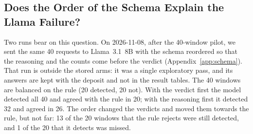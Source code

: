 \subsection{Does the Order of the Schema Explain the Llama Failure?}
\label{sec:results:order}

Two runs bear on this question. On 2026-11-08, after the 40-window pilot, we sent the same 40 requests to Llama~3.1~8B with the schema reordered so that the reasoning and the counts come before the verdict (Appendix~\ref{app:schema}). That run is outside the stored arms: it was a single exploratory pass, and its answers are kept with the deposit and not in the result tables. The 40 windows are balanced on the rule (20 detected, 20 not). With the verdict first the model detected all 40 and agreed with the rule in 20; with the reasoning first it detected 32 and agreed in 26. The order changed the verdicts and moved them towards the rule, but not far: 13 of the 20 windows that the rule rejects were still detected, and 1 of the 20 that it detects was missed.

